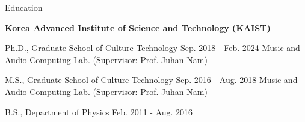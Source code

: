 \documentclass{resume} %
\begin{document}
\begin{rSection}{Education}

\begin{rSubsection}{\bf Korea Advanced Institute of Science and Technology (KAIST)}{}{}{}
\item Ph.D., Graduate School of Culture Technology  \hfill {Sep. 2018 - Feb. 2024}
\subitem Music and Audio Computing Lab. (Supervisor: Prof. Juhan Nam)
\item M.S., Graduate School of Culture Technology  \hfill {Sep. 2016 - Aug. 2018}
\subitem Music and Audio Computing Lab. (Supervisor: Prof. Juhan Nam)
\item B.S., Department of Physics \hfill {Feb. 2011 - Aug. 2016}
\end{rSubsection}

\end{rSection}
\end{document}

